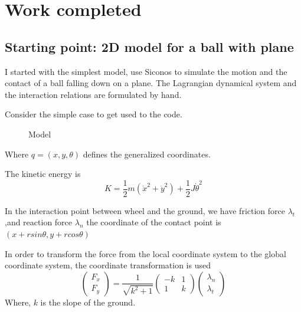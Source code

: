 \chapter{Work completed}
\ifpdf
    \graphicspath{{Chapter3/PNG/}{Chapter3/PDF/}{Chapter3/}}
\else
    \graphicspath{{Chapter3/}{Chapter3/}}
\fi

\section{Starting point: 2D model for a ball with plane}

I started with the simplest model, use Siconos to simulate the motion and the contact of a ball falling down on a plane. The Lagrangian dynamical system and the interaction relations are formulated by hand.

Consider the simple case to get used to the code.

\begin{figure}[htbp]
\begin{center}
 
\caption{Model}
\end{center}
\end{figure}

Where $q=(x,y,\theta)$ defines the generalized coordinates.

The kinetic energy is 
\begin{equation}
K=\frac{1}{2}m(\dot{x}^2+\dot{y}^2)+\frac{1}{2}J\dot{\theta}^2
\end{equation}


In the interaction point between wheel and the ground, we have friction force $\lambda_t$,and reaction force $\lambda_n$
the coordinate of the contact point is $(x+rsin\theta,y+rcos\theta)$

In order to transform the force from the local coordinate system to the global coordinate system, the coordinate transformation is used
\begin{equation}
\begin{pmatrix}
F_x\\F_y
\end{pmatrix}=
\frac{1}{\sqrt{k^2+1}}\begin{pmatrix}
-k & 1\\
1 & k \end{pmatrix}
\begin{pmatrix}
\lambda_n \\ \lambda_t
\end{pmatrix}
\end{equation}
Where, $k$ is the slope of the ground.\\


